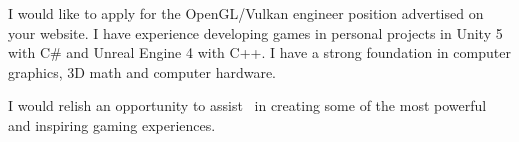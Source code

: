 I would like to apply for the OpenGL/Vulkan engineer position advertised on your website.
I have experience developing games in personal projects in Unity 5 with C\# and Unreal Engine 4 with C++.
I have a strong foundation in computer graphics, 3D math and computer hardware.

I would relish an opportunity to assist \company~in creating some of the most powerful and inspiring gaming experiences. 